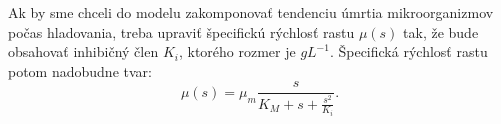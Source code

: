 Ak by sme chceli do modelu zakomponovať tendenciu úmrtia mikroorganizmov počas hladovania, treba upraviť špecifickú rýchlosť rastu $\mu(s)$ tak, že bude obsahovať inhibičný člen $ K_i $, ktorého rozmer je $gL^{-1}$.
Špecifická rýchlosť rastu potom nadobudne tvar:
\begin{equation} \label{eq:8}
	\mu(s) = \mu_{m}\frac{s}{K_{M} + s + \frac{s^2}{K_i}}.
\end{equation}
